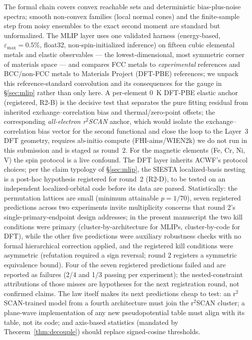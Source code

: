 \documentclass[11pt]{article}
\theoremstyle{remark}
\begin{document}
The formal chain covers convex reachable sets and deterministic
bias-plus-noise spectra; smooth non-convex families (local normal cones) and
the finite-sample step from noisy ensembles to the exact second moment are
standard but unformalized. The MLIP layer uses one validated harness
(energy-based, $\varepsilon_{\max}=0.5\%$, float32, non-spin-initialized
inference) on fifteen cubic elemental metals and elastic observables --- the
lowest-dimensional, most symmetric corner of materials space --- and compares
FCC metals to \emph{experimental} references and BCC/non-FCC metals to
Materials Project (DFT-PBE) references; we unpack this reference-standard
convolution and its consequences for the gauge in \S\ref{sec:mlip} rather than
only here. A per-element 0~K DFT-PBE elastic anchor (registered, R2-B) is the
decisive test that separates the pure fitting residual from inherited
exchange--correlation bias and thermal/zero-point offsets; the corresponding
\emph{all-electron r$^2$SCAN} anchor, which would isolate the
exchange--correlation bias vector for the second functional and close the loop
to the Layer~3 DFT geometry, requires ab-initio compute (FHI-aims/WIEN2k) we do
not run in this submission and is staged as round~2. For the magnetic elements
(Fe, Cr, Ni, V) the spin protocol is a live confound. The DFT layer inherits
ACWF's protocol choices; per the claim typology of \S\ref{sec:mlip}, the SIESTA
localized-basis nesting is a post-hoc hypothesis registered for round~2 (R2-D),
to be tested on an independent localized-orbital code before its data are parsed. Statistically:
the permutation lattices are small (minimum attainable $p = 1/70$), seven
registered predictions across two experiments invite multiplicity concerns
that round 2's single-primary-endpoint design addresses; in the present
manuscript the two kill conditions were primary (cluster-by-architecture for
MLIPs, cluster-by-code for DFT), while the other five predictions were
auxiliary robustness checks with no formal hierarchical correction applied, and the registered
kill conditions were asymmetric (refutation required a sign reversal;
round 2 registers a symmetric equivalence bound). Four of the seven
registered predictions failed and are reported as failures (2/4 and 1/3
passing per experiment); the nested-constraint attributions of those misses
are hypotheses for the next registration round, not confirmed claims. The law
itself makes its next predictions cheap to test: an r$^2$SCAN-trained model
from a fourth architecture must join the r$^2$SCAN cluster; a plane-wave
implementation of any new pseudopotential table must align with its table,
not its code; and axis-based statistics (mandated by
Theorem~\ref{thm:decouple}) should replace signed-cosine thresholds.
\end{document}
